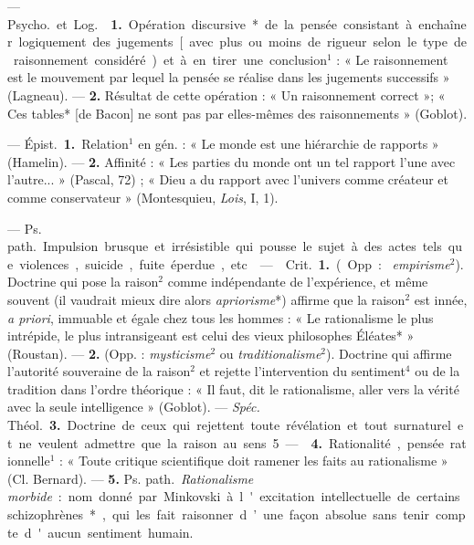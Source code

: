 \begin{itemize}[leftmargin=1cm, label=, itemsep=1pt]
 — \si{Psycho.} et \si{Log.}  {\bf 1.}
Opération discursive* de la pensée consistant à enchaîner logiquement des
jugements [avec plus ou moins de rigueur selon le type de raisonnement
considéré) et à en tirer une conclusion$^1$ : « Le raisonnement est
le mouvement par lequel la pensée se réalise dans les jugements successifs
» (Lagneau). —  {\bf 2.} Résultat de cette opération : « Un
raisonnement correct »; « Ces tables* [de Bacon] ne sont pas par elles-mêmes
des raisonnements » (Goblot).

 — \si{Épist.} {\bf 1.} Relation$^1$ en gén. : « Le monde est une
hiérarchie de rapports » (Hamelin). — {\bf 2.} Affinité : « Les parties du
monde ont un tel rapport l’une avec l’autre... » (Pascal, 72) ; « Dieu a du
rapport avec l’univers comme créateur et comme conservateur » (Montesquieu,
{\it Lois}, I, 1).

 — \si{Ps. path.} Impulsion brusque et irrésistible qui pousse le
sujet à des actes tels que violences, suicide, fuite éperdue, etc.

 —  \si{Crit.} {\bf 1.} (Opp. : {\it
empirisme}$^2$). Doctrine qui pose la raison$^2$ comme indépendante de
l'expérience, et même souvent (il vaudrait mieux dire alors
{\it apriorisme}*) affirme que la raison$^2$ est innée, {\it a priori},
immuable et égale chez tous les hommes : « Le rationalisme le plus intrépide,
le plus intransigeant est celui des vieux philosophes Éléates* » (Roustan). —
{\bf 2.} (Opp. : {\it mysticisme}$^2$ ou {\it traditionalisme}$^2$). Doctrine
qui affirme l’autorité souveraine de la raison$^2$ et rejette l'intervention
du sentiment$^4$ ou de la tradition dans l’ordre théorique : « Il faut, dit
le rationalisme, aller vers la vérité avec la seule intelligence » (Goblot).
— {\it Spéc.} \si{Théol.} {\bf 3.} Doctrine de ceux qui rejettent toute
révélation et tout surnaturel et ne veulent admettre que la raison au sens 5.

—  {\bf 4.} Rationalité, pensée rationnelle$^1$ : « Toute
critique scientifique doit ramener les faits au rationalisme » (Cl. Bernard).
— {\bf 5.} \si{Ps. path.} {\it Rationalisme morbide} : nom donné par
Minkovski à l'excitation intellectuelle de certains schizophrènes*, qui les
fait raisonner d’une façon absolue sans tenir compte d'aucun sentiment humain.


\end{itemize}
